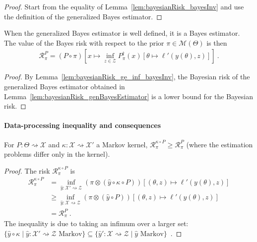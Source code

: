 \begin{proof}%
{}
Start from the equality of Lemma~\ref{lem:bayesianRisk_bayesInv} and use the definition of the generalized Bayes estimator.
\end{proof}

\begin{theorem}
  \label{thm:isBayesEstimator_genBayesEstimator}
  When the generalized Bayes estimator is well defined, it is a Bayes estimator. The value of the Bayes risk with respect to the prior $\pi \in \mathcal M(\Theta)$ is then
  \begin{align*}
  \mathcal R^P_\pi = (P \circ \pi)\left[x \mapsto \inf_{z \in \mathcal Z} P_\pi^\dagger(x) \left[\theta \mapsto \ell'(y(\theta), z)\right]\right]
  \: .
  \end{align*}
\end{theorem}

\begin{proof}%
{}
By Lemma~\ref{lem:bayesianRisk_ge_inf_bayesInv}, the Bayesian risk of the generalized Bayes estimator obtained in Lemma~\ref{lem:bayesianRisk_genBayesEstimator} is a lower bound for the Bayesian risk.
\end{proof}

\paragraph{Data-processing inequality and consequences}

\begin{theorem}
  \label{thm:data_proc_bayesRisk}
  \leanok
  For $P : \Theta \rightsquigarrow \mathcal X$ and $\kappa : \mathcal X \rightsquigarrow \mathcal X'$ a Markov kernel, $\mathcal R^{\kappa \circ P}_\pi \ge \mathcal R^{P}_\pi$ (where the estimation problems differ only in the kernel).
\end{theorem}

\begin{proof}\leanok
\uses{}
The risk $\mathcal R^{\kappa \circ P}_\pi$ is
\begin{align*}
\mathcal R^{\kappa \circ P}_\pi
&= \inf_{\hat{y} : \mathcal X' \rightsquigarrow \mathcal Z} (\pi \otimes (\hat{y} \circ \kappa \circ P))\left[(\theta, z) \mapsto \ell'(y(\theta), z)\right]
\\
&\ge \inf_{\hat{y} : \mathcal X \rightsquigarrow \mathcal Z} (\pi \otimes (\hat{y} \circ P))\left[(\theta, z) \mapsto \ell'(y(\theta), z)\right]
\\
&= \mathcal R^{P}_\pi
\: .
\end{align*}
The inequality is due to taking an infimum over a larger set: $\{\hat{y} \circ \kappa \mid \hat{y} : \mathcal X' \rightsquigarrow \mathcal Z \text{ Markov}\} \subseteq \{\hat{y}' : \mathcal X \rightsquigarrow \mathcal Z \mid \hat{y} \text{ Markov}\}$~.
\end{proof}

